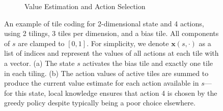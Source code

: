 \documentclass[10pt, times, comsoc]{IEEEtran}
\begin{document}
\begin{figure}
\begin{subfigure}{0.4\linewidth}
{
		}
		\caption{\centering Value Estimation and Action Selection\label{fig:tilecode-select}}
	\end{subfigure}
	
	\caption{
		An example of tile coding for 2-dimensional state and 4 actions, using 2 tilings, 3 tiles per dimension, and a bias tile.
		All components of $s$ are clamped to $[0,1]$.
		For simplicity, we denote $\bm{x}(s,\cdot)$ as a list of indices and represent the values of all actions at each tile with a vector.
		(a) The state $s$ activates the bias tile and exactly one tile in each tiling.
		(b) The action values of active tiles are summed to produce the current value estimate for each action available in $s$---for this state, local knowledge ensures that action 4 is chosen by the greedy policy despite typically being a poor choice elsewhere.
		\label{fig:tilecode}
	}
	\vspace{-0.6cm}
\end{figure}
\end{document}

